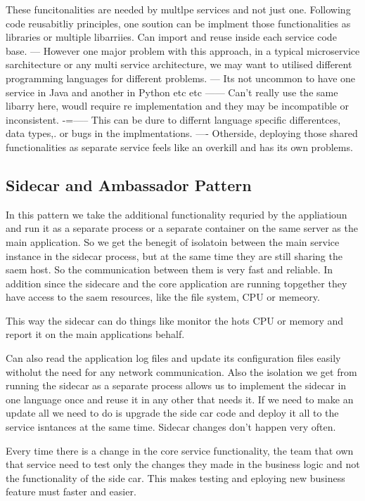 \documentclass[a4paper, 11pt]{book}
\begin{document}
{    These funcitonalities are needed by multlpe services and not just one.
    Following code reusabitliy principles, one soution can be implment those functionalities as libraries or multiple libarriies.
    Can import and reuse inside each service code base.
    --- However one major problem with this approach, in a typical microservice sarchitecture or any multi service architecture, we may want to utilised different programming languages for different problems.
    --- Its not uncommon to have one service in Java and another in Python etc etc
    ------ Can't really use the same libarry here, woudl require re implementation and they may be incompatible or inconsistent.
    -=----- This can be dure to differnt language specific differentces, data types,. or bugs in the implmentations.
    ---- Otherside, deploying those shared functionalities as separate service feels like an overkill and has its own problems.

    \subsection{Sidecar and Ambassador Pattern}
    In this pattern we take the additional functionality requried by the appliatioun and run it as a separate process or a separate container on the same server as the main application.
    So we get the benegit of isolatoin between the main service instance in the sidecar process, but at the same time they are still sharing the saem host.
    So the communication between them is very fast and reliable.
    In addition since the sidecare and the core application are running topgether they have access to the saem resources, like the file system, CPU or memeory.

    This way the sidecar can do things like monitor the hots CPU or memory and report it on the main applications behalf.

    Can also read the application log files and update its configuration files easily witholut the need for any network communication.
    Also the isolation we get from running the sidecar as a separate process allows us to implement the sidecar in one language once and reuse it in any other that needs it.
    If we need to make an update all we need to do is upgrade the side car code and deploy it all to the service isntances at the same time.
    Sidecar changes don't happen very often.

    Every time there is a change in the core service functionality, the team that own that service need to test only the changes they made in the business logic and not the functionality of the side car.
    This makes testing and eploying new business feature must faster and easier.

}
\end{document}
